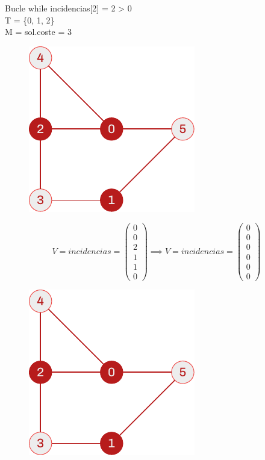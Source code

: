 \documentclass[spanish]{beamer}
\begin{document}
\begin{frame}{Bucle while}
	incidencias[2] = 2 > 0\\
	T = \{0, 1, 2\}\\
	M = sol.coste = 3
	\begin{figure}[H]
		\centering \includegraphics{./img/grafo-ejemplo-pres.pdf}
	\end{figure}
\end{frame}

\begin{frame}{}
	$$  V = incidencias =
	\begin{pmatrix}
	  0 \\
	  0 \\
	  2 \\
	  1 \\
	  1 \\
	  0
	\end{pmatrix} \implies  V = incidencias =
	\begin{pmatrix}
	  0 \\
	  0 \\
	  0 \\
	  0 \\
	  0 \\
	  0
	\end{pmatrix}$$
	\begin{figure}[H]
		\centering \includegraphics{./img/grafo-ejemplo-pres.pdf}
	\end{figure}
\end{frame}
\end{document}
